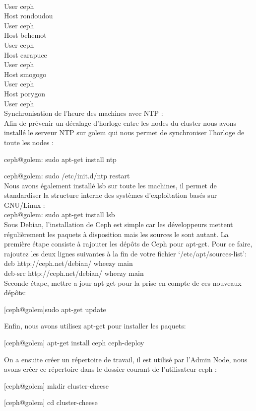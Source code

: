 \documentclass{article}
\begin{document}
\\User ceph
\\Host rondoudou
\\User ceph
\\Host behemot
\\User ceph
\\Host carapuce
\\User ceph
\\Host smogogo
\\User ceph
\\Host porygon
\\User ceph
\\Synchronisation de l'heure des machines avec NTP :
\\Afin de prévenir un décalage d'horloge entre les nodes du cluster nous avons installé le serveur NTP sur golem qui nous permet de synchroniser l'horloge de toute les nodes :

ceph@golem: sudo apt-get install ntp

ceph@golem: sudo /etc/init.d/ntp restart
\\Nous avons également installé lsb sur toute les machines, il permet de standardiser la structure interne des systèmes d'exploitation basés sur GNU/Linux :
\\ceph@golem: sudo apt-get install lsb
\\Sous Debian, l'installation de Ceph est simple car les développeurs mettent régulièrement les paquets à disposition mais les sources le sont autant.
La première étape consiste à rajouter les dépôts de Ceph pour apt-get.
Pour ce faire, rajoutez les deux lignes suivantes à la fin de votre fichier ‘/etc/apt/sources-list’:
\\deb http://ceph.net/debian/ wheezy main
\\deb-src http://ceph.net/debian/ wheezy main
\\Seconde étape,  mettre a jour apt-get pour la prise en compte de ces nouveaux dépôts:

[ceph@golem]sudo apt-get update

Enfin, nous avons utilisez apt-get pour installer les paquets:

[ceph@golem] apt-get install ceph ceph-deploy

On a ensuite créer un répertoire de travail, il est utilisé par l'Admin Node, nous avons créer ce répertoire dans le dossier courant de l'utilisateur ceph :

[ceph@golem] mkdir cluster-cheese

[ceph@golem] cd cluster-cheese
\end{document}
